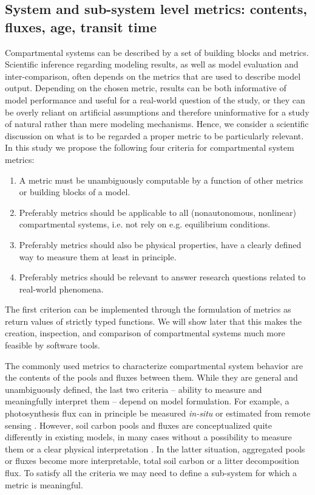 \subsection{System and sub-system level metrics: contents, fluxes, age, transit time}
Compartmental systems can be described by a set of building blocks and metrics. 
Scientific inference regarding modeling results, as well as model evaluation and inter-comparison, often depends on the metrics that are used to describe model output.
Depending on the chosen metric, results can be both informative of model performance and useful for a real-world question of the study, or they can be overly reliant on artificial assumptions and therefore uninformative for a study of natural rather than mere modeling mechanisms.
Hence, we consider a scientific discussion on what is to be regarded a proper metric to be particularly relevant.
In this study we propose the following four criteria for compartmental system metrics:
\begin{enumerate}
  \item
    \label{enum:function}
    A metric must be unambiguously computable by a function of other metrics or building blocks of a model. 
  \item
    \label{enum:general}
    Preferably metrics should be applicable to all (nonautonomous, nonlinear) compartmental systems, i.e. not rely on e.g. equilibrium conditions.
  \item
    \label{enum:measurable}
  Preferably  metrics should also be physical properties, \ie have a clearly defined way to measure them at least in principle.
  \item
    \label{enum:meaningful}
  Preferably  metrics should be relevant to answer research questions related to real-world phenomena.
\end{enumerate}

The first criterion can be implemented through the formulation of metrics as return values of
strictly typed functions. We will show later that this makes the creation, inspection, and
comparison of compartmental systems much more feasible by software tools. 

The commonly used metrics to characterize compartmental system behavior are the
contents of the pools and fluxes between them. While they are general and
unambiguously defined, the last two criteria -- ability to measure and
meaningfully interpret them -- depend on model formulation. For example, a
photosynthesis flux can in principle be measured \textit{in-situ} or estimated
from remote sensing \citep{jez_emerging_2021, sun_remotely_2023}. However, soil
carbon pools and fluxes are conceptualized quite differently in existing
models, in many cases without a possibility to measure them or a clear physical interpretation 
\cite{abramoff_millennial_2018}
.  In the latter situation,
aggregated pools or fluxes become more interpretable, \eg total soil carbon 
or a litter decomposition flux. To satisfy all the criteria we may need
to define a sub-system for which a metric is meaningful.   

